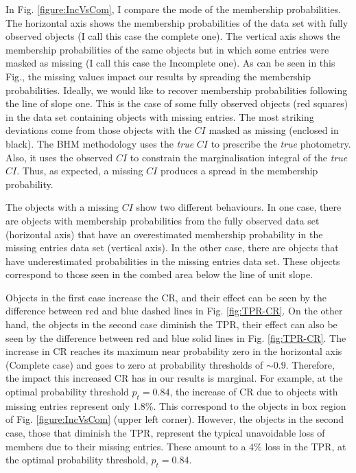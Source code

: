 In Fig. \ref{figure:IncVsCom}, I compare the mode of the membership probabilities. The horizontal axis shows the membership probabilities of the data set with fully observed objects (I call this case the complete one). The vertical axis shows the membership probabilities of the same objects but in which some entries were masked as missing (I call this case the Incomplete one). As can be seen in this Fig., the missing values impact our results by spreading the membership probabilities. Ideally, we would like to recover membership probabilities following the line of slope one. This is the case of some fully observed objects (red squares) in the data set containing objects with missing entries. The most striking deviations come from those objects with the $CI$ masked as missing (enclosed in black). The BHM methodology uses the \emph{true} $CI$ to prescribe the \emph{true} photometry. Also, it uses the observed $CI$ to constrain the marginalisation integral of the \emph{true} $CI$. Thus, as expected, a missing $CI$ produces a spread in the membership probability. 

The objects with a missing $CI$ show two different behaviours. In one case, there are objects with membership probabilities from the fully observed data set (horizontal axis) that have an overestimated membership probability in the missing entries data set (vertical axis). In the other case, there are objects that have underestimated probabilities in the missing entries data set. These objects correspond to those seen in the combed area below the line of unit slope. 

Objects in the first case increase the CR, and their effect can be seen by the difference between red and blue dashed lines in Fig. \ref{fig:TPR-CR}. On the other hand, the objects in the second case diminish the TPR, their effect can also be seen by the difference between red and blue solid lines in Fig. \ref{fig:TPR-CR}. The increase in CR reaches its maximum near probability zero in the horizontal axis (Complete case) and goes to zero at probability thresholds of $\sim 0.9$. Therefore, the impact this increased CR has in our results is marginal. For example, at the optimal probability threshold $p_t=0.84$, the increase of CR due to objects with missing entries represent only 1.8\%. This correspond to the objects in box region of Fig. \ref{figure:IncVsCom} (upper left corner). However, the objects in the second case, those that diminish the TPR, represent the typical unavoidable loss of members due to their missing entries. These amount to a 4\% loss in the TPR, at the optimal probability threshold, $p_t=0.84$.


